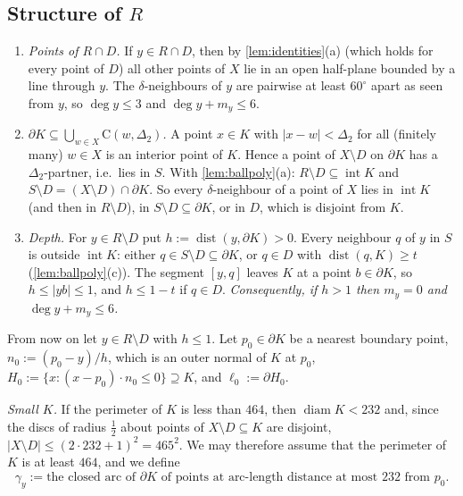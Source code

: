 \documentclass[11pt]{amsart}
\theoremstyle{definition}
\theoremstyle{remark}
\newcommand{\Dt}{\Delta_2}
\newcommand{\dist}{\operatorname{dist}}
\newcommand{\Cc}{\mathrm{C}}      %
\begin{document}
\subsection{Structure of \texorpdfstring{$R$}{R}}\label{sec:structR}
\begin{enumerate}[label=(\alph*),leftmargin=2em]
\item \emph{Points of $R\cap D$.} If $y\in R\cap D$, then by \cref{lem:identities}(a) (which holds for every point of $D$) all other points of $X$ lie in an open half-plane bounded by a line through $y$. The $\delta$-neighbours of $y$ are pairwise at least $60^\circ$ apart as seen from $y$, so $\deg y\le3$ and $\deg y+m_y\le6$.
\item \emph{$\partial K\subseteq\bigcup_{w\in X}\Cc(w,\Dt)$.} A point $x\in K$ with $|x-w|<\Dt$ for all (finitely many) $w\in X$ is an interior point of $K$. Hence a point of $X\setminus D$ on $\partial K$ has a $\Dt$-partner, i.e.\ lies in $S$. With \cref{lem:ballpoly}(a): $R\setminus D\subseteq\operatorname{int}K$ and $S\setminus D=(X\setminus D)\cap\partial K$. So every $\delta$-neighbour of a point of $X$ lies in $\operatorname{int}K$ (and then in $R\setminus D$), in $S\setminus D\subseteq\partial K$, or in $D$, which is disjoint from $K$.
\item \emph{Depth.} For $y\in R\setminus D$ put $h:=\dist(y,\partial K)>0$. Every neighbour $q$ of $y$ in $S$ is outside $\operatorname{int}K$: either $q\in S\setminus D\subseteq\partial K$, or $q\in D$ with $\dist(q,K)\ge t$ (\cref{lem:ballpoly}(c)). The segment $[y,q]$ leaves $K$ at a point $b\in\partial K$, so $h\le|yb|\le1$, and $h\le1-t$ if $q\in D$. \emph{Consequently, if $h>1$ then $m_y=0$ and $\deg y+m_y\le6$.}
\end{enumerate}

From now on let $y\in R\setminus D$ with $h\le1$. Let $p_0\in\partial K$ be a nearest boundary point, $n_0:=(p_0-y)/h$, which is an outer normal of $K$ at $p_0$, $H_0:=\{x:(x-p_0)\cdot n_0\le0\}\supseteq K$, and $\ell_0:=\partial H_0$.

\emph{Small $K$.} If the perimeter of $K$ is less than $464$, then $\operatorname{diam}K<232$ and, since the discs of radius $\frac12$ about points of $X\setminus D\subseteq K$ are disjoint, $|X\setminus D|\le(2\cdot232+1)^2=465^2$. We may therefore assume that the perimeter of $K$ is at least $464$, and we define
\[
\gamma_y:=\text{the closed arc of $\partial K$ of points at arc-length distance at most $232$ from $p_0$.}
\]
\end{document}
